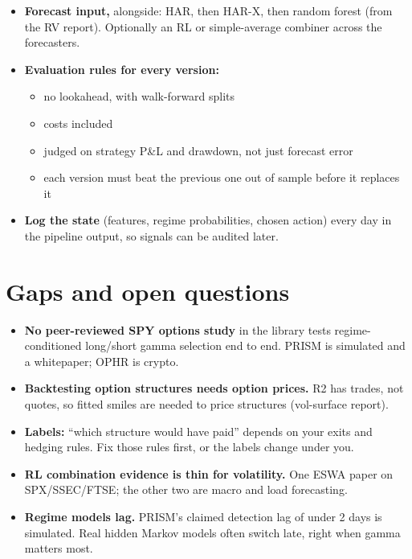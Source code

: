 \documentclass{article}
\begin{document}
\begin{itemize}
\item \textbf{Forecast input,} alongside: HAR, then HAR-X, then random forest (from the RV report). Optionally an RL or simple-average combiner across the forecasters.

\item \textbf{Evaluation rules for every version:}

\begin{itemize}

\item no lookahead, with walk-forward splits

\item costs included

\item judged on strategy P\&L and drawdown, not just forecast error

\item each version must beat the previous one out of sample before it replaces it

\end{itemize}

\item \textbf{Log the state} (features, regime probabilities, chosen action) every day in the pipeline output, so signals can be audited later.

\end{itemize}

\section{Gaps and open questions}

\begin{itemize}

\item \textbf{No peer-reviewed SPY options study} in the library tests regime-conditioned long/\allowbreak{}short gamma selection end to end. PRISM is simulated and a whitepaper; OPHR is crypto.

\item \textbf{Backtesting option structures needs option prices.} R2 has trades, not quotes, so fitted smiles are needed to price structures (vol-surface report).

\item \textbf{Labels:} ``which structure would have paid'' depends on your exits and hedging rules. Fix those rules first, or the labels change under you.

\item \textbf{RL combination evidence is thin for volatility.} One ESWA paper on SPX/\allowbreak{}SSEC/\allowbreak{}FTSE; the other two are macro and load forecasting.

\item \textbf{Regime models lag.} PRISM's claimed detection lag of under 2 days is simulated. Real hidden Markov models often switch late, right when gamma matters most.

\end{itemize}
\end{document}
